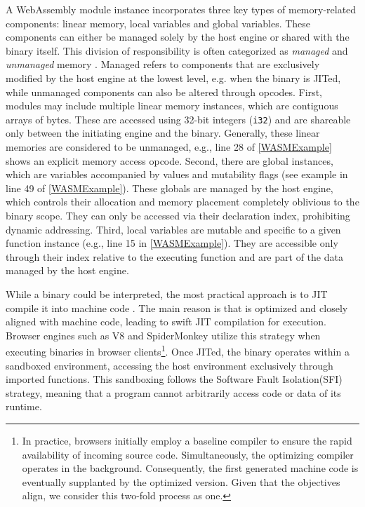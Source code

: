  A WebAssembly module instance incorporates three key types of memory-related components: linear memory, local variables and global variables. 
These components can either be managed solely by the host engine or shared with the \Wasm binary itself. 
This division of responsibility is often categorized as \emph{managed} and \emph{unmanaged} memory \cite{usenixWasm2020}. 
Managed refers to components that are exclusively modified by the host engine at the lowest level, e.g. when the \Wasm binary is JITed, while unmanaged components can also be altered through  \Wasm opcodes.
First, modules may include multiple linear memory instances, which are contiguous arrays of bytes. 
These are accessed using 32-bit integers (\texttt{i32}) and are shareable only between the initiating engine and the \Wasm binary. 
Generally, these linear memories are considered to be unmanaged, e.g., line 28 of \autoref{WASMExample} shows an explicit memory access opcode. 
Second, there are global instances, which are variables accompanied by values and mutability flags (see example in line 49 of \autoref{WASMExample}). 
These globals are managed by the host engine, which controls their allocation and memory placement completely oblivious to the \Wasm binary scope. 
They can only be accessed via their declaration index, prohibiting dynamic addressing. 
Third, local variables are mutable and specific to a given function instance (e.g., line 15 in \autoref{WASMExample}). 
They are accessible only through their index relative to the executing function and are part of the data managed by the host engine.


While a \Wasm binary could be interpreted, the most practical approach is to JIT compile it into machine code \cite{2023arXiv230513241T}.
The main reason is that \Wasm is optimized and closely aligned with machine code, leading to swift JIT compilation for execution.
Browser engines such as V8 and SpiderMonkey utilize this strategy when executing \Wasm binaries in browser clients\footnote{
    In practice, browsers initially employ a baseline compiler to ensure the rapid availability of incoming source code. 
    Simultaneously, the optimizing compiler operates in the background. 
    Consequently, the first generated machine code is eventually supplanted by the optimized version. 
    Given that the objectives align, we consider this two-fold process as one.
}.
Once JITed, the \Wasm binary operates within a sandboxed environment, accessing the host environment exclusively through imported functions.
This sandboxing follows the Software Fault Isolation(SFI) strategy, meaning that a \Wasm program cannot arbitrarily access code or data of its runtime.  


